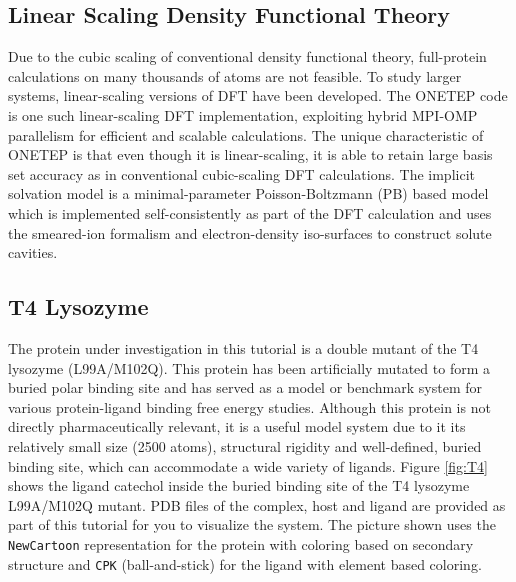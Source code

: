 \documentclass{article}
\newcommand{\vmd}[1]{\texttt{#1}}
\begin{document}
\subsection{Linear Scaling Density Functional Theory}
Due to the cubic scaling of conventional density functional theory, full-protein calculations on many thousands of atoms are not feasible. To study larger systems, linear-scaling versions of DFT have been developed\cite{Bowler2012}. The ONETEP code\cite{Prentice2020} is one such linear-scaling DFT implementation,  exploiting hybrid MPI-OMP parallelism\cite{Wilkinson2014} for efficient and scalable calculations. The unique characteristic of ONETEP is that even though it is linear-scaling, it is able to retain large basis set accuracy as in conventional cubic-scaling DFT calculations.  The implicit solvation model is a minimal-parameter Poisson-Boltzmann (PB) based model which is implemented self-consistently as part of the DFT calculation\cite{Dziedzic2011,Womack2018} and uses the smeared-ion formalism and electron-density iso-surfaces to construct solute cavities.

\subsection{T4 Lysozyme}
The protein under investigation in this tutorial is a double mutant of the T4 lysozyme (L99A/M102Q). This protein has been artificially mutated to form a buried polar binding site and has served as a model or benchmark system for various protein-ligand binding free energy studies\cite{Mobley2017}. Although this protein is not directly pharmaceutically relevant, it is a useful model system due to it its relatively small size (2500 atoms), structural rigidity and well-defined, buried binding site, which can accommodate a wide variety of ligands. Figure \ref{fig:T4} shows the ligand catechol inside the buried binding site of the T4 lysozyme L99A/M102Q mutant. PDB files of the complex, host and ligand are provided as part of this tutorial for you to visualize the system. The picture shown uses the \vmd{NewCartoon} representation for the protein with coloring based on secondary structure and \vmd{CPK} (ball-and-stick) for the ligand with element based coloring. 
\end{document}
